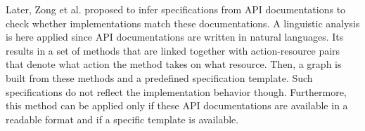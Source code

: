 Later, Zong et al. \cite{ZhongZXM11} proposed to infer
specifications from API documentations to check whether
implementations match these documentations. A linguistic analysis is here applied since API documentations are written in natural languages. Its results in a set of methods that are linked together with action-resource
pairs that  denote what action
the method takes on what resource. Then, a graph is built from these methods and a predefined specification template. Such specifications do not reflect the
implementation behavior though. Furthermore, this method can be
applied only if these API documentations are available in a
readable format and if a specific template is available.
